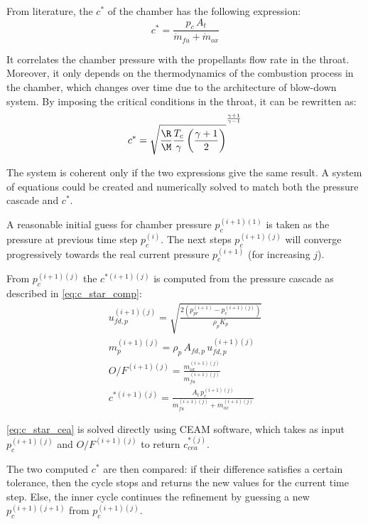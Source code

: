 From literature, the $c^*$ of the chamber has the following expression:
\begin{equation}
    c^* = \frac{p_c \, A_t}{\dot{m}_{fu} + \dot{m}_{ox}}
    \label{eq:c_star_comp}
\end{equation}

It correlates the chamber pressure with the propellants flow rate in the throat. Moreover, it only depends on the thermodynamics of the combustion process in the chamber, which changes over time due to the architecture of blow-down system. By imposing the critical conditions in the throat, it can be rewritten as:
\begin{equation}
    c^* = \sqrt{\frac{\R}{\M} \frac{T_c}{\gamma} \left( \frac{\gamma + 1}{2} \right)} ^{^{^ {\frac{\gamma + 1}{\gamma - 1}} }}
    \label{eq:c_star_cea}
\end{equation}

The system is coherent only if the two expressions give the same result. A system of equations could be created and numerically solved to match both the pressure cascade and $c^*$.

A reasonable initial guess for chamber pressure $p_c ^ {(i+1)(1)}$ is taken as the pressure at previous time step $p_c ^ {(i)}$. The next steps $p_c ^ {(i+1)(j)}$ will converge progressively towards the real current pressure $p_c ^ {(i+1)}$ (for increasing $j$).

From $p_c ^ {(i+1)(j)}$ the $c^{*(i+1)(j)}$ is computed from the pressure cascade as described in \autoref{eq:c_star_comp}:
\begin{gather}
    u_{fd,p} ^ {(i+1)(j)} = \sqrt{\frac{2 \left( p_{pr} ^ {(i+1)} - p_c ^ {(i+1)(j)} \right)}{\rho_p K_p}}
    \\[3pt]
    m_p ^ {(i+1)(j)} = \rho_p \, A_{fd,p} \, u_{fd,p} ^ {(i+1)(j)}
    \\[3pt]
    O/F ^ {(i+1)(j)} = \frac{m_{ox} ^ {(i+1)(j)}}{m_{fu} ^ {(i+1)(j)}}
    \\[3pt]
    c^{*(i+1)(j)} = \frac{A_t \, p_c ^ {(i+1)(j)}}{\dot{m}_{fu} ^ {(i+1)(j)} + \dot{m}_{ox} ^ {(i+1)(j)}}
\end{gather}

\autoref{eq:c_star_cea} is solved directly using CEAM software, which takes as input $p_c ^ {(i+1)(j)}$ and $O/F ^ {(i+1)(j)}$ to return $c_{cea}^{*(j)}$.

The two computed $c^*$ are then compared: if their difference satisfies a certain tolerance, then the cycle stops and returns the new values for the current time step. Else, the inner cycle continues the refinement by guessing a new $p_c ^ {(i+1)(j+1)}$ from $p_c ^ {(i+1)(j)}$.

